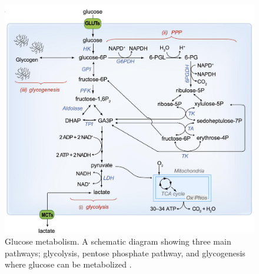 \begin{figure}[!htbp]
  \includegraphics[width=\linewidth]{figures/10_glucose_metabolism}
  \caption{Glucose metabolism. A schematic diagram showing three main pathways; glycolysis, pentose phosphate pathway, and glycogenesis where glucose can be metabolized \citep{Belanger2011} .}
  \label{fig:10_glucose_metabolism}
\end{figure}

